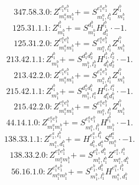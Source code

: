\documentclass[letterpaper,10pt,fleqn,leqno,onecolumn]{article}
\begin{document}
\begin{equation} \;\;\;\;\;\;  347.58.3.0: Z^{e_{1}^{a}e_{1}^{b}}_{m_{1}^{a}m_{1}^{b}}+=S^{e_{1}^{a}e_{1}^{b}}_{m_{1}^{a},l_{1}^{b}}Z^{l_{1}^{b}}_{m_{1}^{b}} \end{equation}
\begin{equation} \;\;\;\;\;\;  125.31.1.1: Z^{l_{1}^{b}}_{m_{1}^{b}}+=S^{d_{1}^{b}}_{m_{1}^{b}}H^{l_{1}^{b}}_{d_{1}^{b}}\cdot -1. \end{equation}
\begin{equation} \;\;\;\;\;\;  125.31.2.0: Z^{e_{1}^{a}e_{1}^{b}}_{m_{1}^{a}m_{1}^{b}}+=S^{e_{1}^{a}e_{1}^{b}}_{m_{1}^{a},l_{1}^{b}}Z^{l_{1}^{b}}_{m_{1}^{b}} \end{equation}
\begin{equation} \;\;\;\;\;\;  213.42.1.1: Z^{l_{1}^{b}}_{m_{1}^{b}}+=S^{d_{1}^{b}d_{2}^{b}}_{m_{1}^{b},l_{2}^{b}}H^{l_{1}^{b},l_{2}^{b}}_{d_{1}^{b}d_{2}^{b}}\cdot -1. \end{equation}
\begin{equation} \;\;\;\;\;\;  213.42.2.0: Z^{e_{1}^{a}e_{1}^{b}}_{m_{1}^{a}m_{1}^{b}}+=S^{e_{1}^{a}e_{1}^{b}}_{m_{1}^{a},l_{1}^{b}}Z^{l_{1}^{b}}_{m_{1}^{b}} \end{equation}
\begin{equation} \;\;\;\;\;\;  215.42.1.1: Z^{l_{1}^{b}}_{m_{1}^{b}}+=S^{d_{1}^{a}d_{1}^{b}}_{m_{1}^{b},l_{1}^{a}}H^{l_{1}^{b},l_{1}^{a}}_{d_{1}^{a}d_{1}^{b}}\cdot -1. \end{equation}
\begin{equation} \;\;\;\;\;\;  215.42.2.0: Z^{e_{1}^{a}e_{1}^{b}}_{m_{1}^{a}m_{1}^{b}}+=S^{e_{1}^{a}e_{1}^{b}}_{m_{1}^{a},l_{1}^{b}}Z^{l_{1}^{b}}_{m_{1}^{b}} \end{equation}
\begin{equation} \;\;\;\;\;\;  44.14.1.0: Z^{e_{1}^{a}e_{1}^{b}}_{m_{1}^{a}m_{1}^{b}}+=S^{e_{1}^{a}e_{1}^{b}}_{m_{1}^{a},l_{1}^{b}}H^{l_{1}^{b}}_{m_{1}^{b}}\cdot -1. \end{equation}
\begin{equation} \;\;\;\;\;\;  138.33.1.1: Z^{e_{1}^{a},l_{1}^{b}}_{m_{1}^{a},d_{1}^{b}}+=H^{e_{1}^{a},l_{1}^{b}}_{d_{1}^{b},d_{1}^{a}}S^{d_{1}^{a}}_{m_{1}^{a}}\cdot -1. \end{equation}
\begin{equation} \;\;\;\;\;\;  138.33.2.0: Z^{e_{1}^{a}e_{1}^{b}}_{m_{1}^{a}m_{1}^{b}}+=S^{e_{1}^{b},d_{1}^{b}}_{m_{1}^{b},l_{1}^{b}}Z^{e_{1}^{a},l_{1}^{b}}_{m_{1}^{a},d_{1}^{b}} \end{equation}
\begin{equation} \;\;\;\;\;\;  56.16.1.0: Z^{e_{1}^{a}e_{1}^{b}}_{m_{1}^{a}m_{1}^{b}}+=S^{e_{1}^{b},d_{1}^{b}}_{m_{1}^{b},l_{1}^{b}}H^{e_{1}^{a},l_{1}^{b}}_{m_{1}^{a},d_{1}^{b}} \end{equation}
\end{document}
